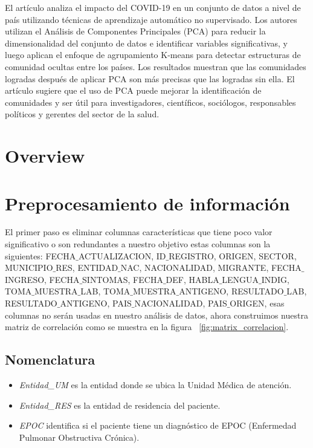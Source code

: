 \documentclass[a4paper,
               ]{jacow}
\begin{document}
El artículo \cite{Chaudhary2021} analiza el impacto del COVID-19 en un conjunto de datos a nivel de país utilizando técnicas de aprendizaje automático no supervisado. Los autores utilizan el Análisis de Componentes Principales (PCA) para reducir la dimensionalidad del conjunto de datos e identificar variables significativas, y luego aplican el enfoque de agrupamiento K-means para detectar estructuras de comunidad ocultas entre los países. Los resultados muestran que las comunidades logradas después de aplicar PCA son más precisas que las logradas sin ella. El artículo sugiere que el uso de PCA puede mejorar la identificación de comunidades y ser útil para investigadores, científicos, sociólogos, responsables políticos y gerentes del sector de la salud.

\section{Overview}

\section{Preprocesamiento de información}

El primer paso es eliminar columnas características que tiene poco valor significativo o son redundantes a nuestro objetivo estas columnas son la siguientes:   FECHA$\_$ACTUALIZACION, ID$\_$REGISTRO, ORIGEN, SECTOR, MUNICIPIO$\_$RES, ENTIDAD$\_$NAC,    NACIONALIDAD, MIGRANTE, FECHA$\_$INGRESO, FECHA$\_$SINTOMAS, FECHA$\_$DEF, HABLA$\_$LENGUA$\_$INDIG, TOMA$\_$MUESTRA$\_$LAB, TOMA$\_$MUESTRA$\_$ANTIGENO, RESULTADO$\_$LAB, RESULTADO$\_$ANTIGENO, PAIS$\_$NACIONALIDAD, PAIS$\_$ORIGEN, esas columnas no serán usadas en nuestro análisis de datos, ahora construimos nuestra matriz de correlación como se muestra en la figura  ~\ref{fig:matrix_correlacion}.

\subsection{Nomenclatura}

\begin{itemize}[label=--]
\item \emph{Entidad_UM} es la entidad donde se ubica la Unidad Médica de atención.
\item \emph{Entidad_RES} es la entidad de residencia del paciente.
\item \emph{EPOC} identifica si el paciente tiene un diagnóstico de EPOC (Enfermedad Pulmonar Obstructiva Crónica). 
\end{itemize}
\end{document}
